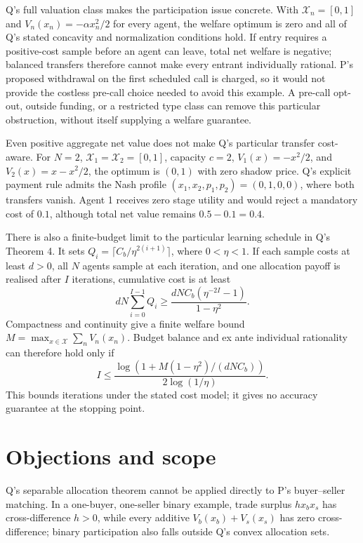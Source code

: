 \documentclass{article}
\begin{document}
Q's full valuation class makes the participation issue concrete. With \(\mathcal X_n=[0,1]\) and \(V_n(x_n)=-\alpha x_n^2/2\) for every agent, the welfare optimum is zero and all of Q's stated concavity and normalization conditions hold. If entry requires a positive-cost sample before an agent can leave, total net welfare is negative; balanced transfers therefore cannot make every entrant individually rational. P's proposed withdrawal on the first scheduled call is charged, so it would not provide the costless pre-call choice needed to avoid this example. A pre-call opt-out, outside funding, or a restricted type class can remove this particular obstruction, without itself supplying a welfare guarantee. 

Even positive aggregate net value does not make Q's particular transfer cost-aware. For \(N=2\), \(\mathcal X_1=\mathcal X_2=[0,1]\), capacity \(c=2\), \(V_1(x)=-x^2/2\), and \(V_2(x)=x-x^2/2\), the optimum is \((0,1)\) with zero shadow price. Q's explicit payment rule admits the Nash profile \((x_1,x_2,p_1,p_2)=(0,1,0,0)\), where both transfers vanish. Agent 1 receives zero stage utility and would reject a mandatory cost of \(0.1\), although total net value remains \(0.5-0.1=0.4\). 

There is also a finite-budget limit to the particular learning schedule in Q's Theorem 4. It sets \(Q_i=\lceil C_b/\eta^{2(i+1)}\rceil\), where \(0<\eta<1\). If each sample costs at least \(d>0\), all \(N\) agents sample at each iteration, and one allocation payoff is realised after \(I\) iterations, cumulative cost is at least
\[
dN\sum_{i=0}^{I-1}Q_i
\geq
\frac{dNC_b(\eta^{-2I}-1)}{1-\eta^2}.
\]
Compactness and continuity give a finite welfare bound \(M=\max_{x\in\mathcal X}\sum_n V_n(x_n)\). Budget balance and ex ante individual rationality can therefore hold only if
\[
I\leq
\frac{\log\!\left(1+M(1-\eta^2)/(dNC_b)\right)}
     {2\log(1/\eta)}.
\]
This bounds iterations under the stated cost model; it gives no accuracy guarantee at the stopping point. 

\section{Objections and scope}
Q's separable allocation theorem cannot be applied directly to P's buyer--seller matching. In a one-buyer, one-seller binary example, trade surplus \(h x_bx_s\) has cross-difference \(h>0\), while every additive \(V_b(x_b)+V_s(x_s)\) has zero cross-difference; binary participation also falls outside Q's convex allocation sets. 
\end{document}
